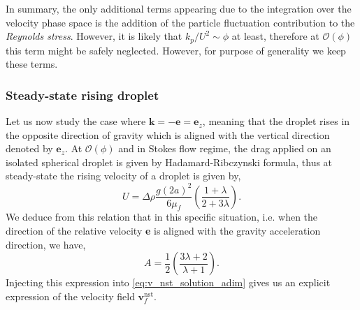 In summary, the only additional terms appearing due to the integration over the velocity phase space is the addition of the particle fluctuation contribution to the \textit{Reynolds stress}. 
However, it is likely that $k_p/U^2 \sim \phi$ at least, therefore at $\mathcal{O}(\phi)$ this term might be safely neglected. 
However, for purpose of generality we keep these terms. 



\subsubsection{Steady-state rising droplet}

Let us now study the case where $\textbf{k} = - \textbf{e} = \textbf{e}_z$, meaning that the droplet rises in the opposite direction of gravity which is aligned with the vertical direction denoted by $\textbf{e}_z$.  
At $\mathcal{O}(\phi)$ and in Stokes flow regime, the drag applied on an isolated spherical droplet is given by Hadamard-Ribczynski formula, thus at steady-state the rising velocity of a droplet is given by, 
\begin{equation}
    U = \Delta \rho \frac{g (2a)^2}{6 \mu_f }\left(\frac{1+\lambda}{2+3\lambda}\right).
    \label{eq:U_isolated}
\end{equation}
We deduce from this relation that in this specific situation, i.e. when the direction of the relative velocity \textbf{e} is aligned with the gravity acceleration direction, we have, 
\begin{equation}
    A = \frac{1}{2}\left(\frac{3\lambda +2}{\lambda +1}\right). 
    \label{eq:closure_A}
\end{equation}
Injecting this expression into \ref{eq:v_nst_solution_adim} gives us an explicit expression of the velocity field $\textbf{v}^\text{nst}_f$. 

